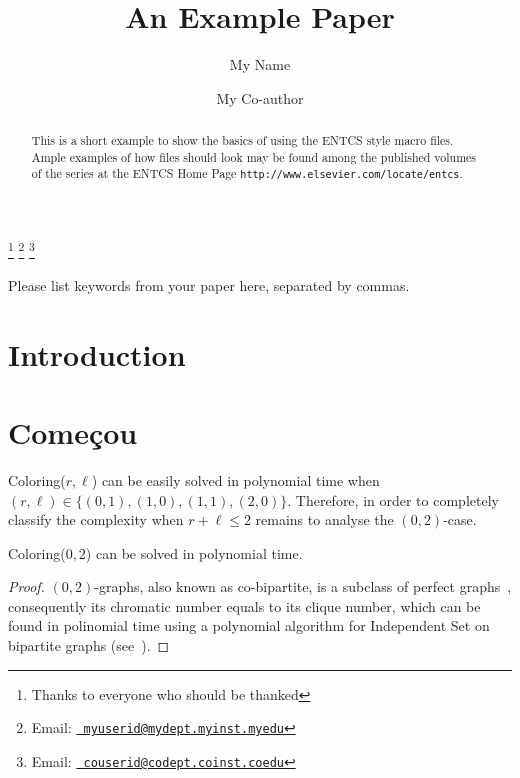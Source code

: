 \documentclass[9pt]{./document-types/entcs} \usepackage{./document-types/entcsmacro}
\begin{document}
\begin{frontmatter}
  \title{An Example Paper} \author{My
    Name}
  \address{My Department\\ My University\\
    My City, My Country} \author{My Co-author}
  \address{My Co-author's Department\\My Co-author's University\\
    My Co-author's City, My Co-author's Country} \thanks[ALL]{Thanks
    to everyone who should be thanked} \thanks[myemail]{Email:
    \href{mailto:myuserid@mydept.myinst.myedu} {\texttt{\normalshape
        myuserid@mydept.myinst.myedu}}} \thanks[coemail]{Email:
    \href{mailto:couserid@codept.coinst.coedu} {\texttt{\normalshape
        couserid@codept.coinst.coedu}}}
\begin{abstract}
  This is a short example to show the basics of using the ENTCS style
  macro files.  Ample examples of how files should look may be found
  among the published volumes of the series at the ENTCS Home Page
  \texttt{http://www.elsevier.com/locate/entcs}.
\end{abstract}
\begin{keyword}
  Please list keywords from your paper here, separated by commas.
\end{keyword}
\end{frontmatter}





\section{Introduction}\label{intro}

\section{Começou}

{\sc Coloring($r,\ell$)} can be easily solved in polynomial time when $(r,\ell) \in \{(0,1),(1,0),(1,1),(2,0)\}$.
Therefore, in order to completely classify the complexity when $r+\ell \leq 2$ remains to analyse the $(0,2)$-case.

	\begin{lemma}
{\sc Coloring($0,2$)} can be solved in polynomial time.
\end{lemma}
	\begin{proof}
$(0,2)$-graphs, also known as co-bipartite, is a subclass of perfect graphs~\cite{bollo98}, consequently its chromatic number
equals to its clique number, which can be found in polinomial time using a polynomial algorithm for {\sc Independent Set}
on bipartite graphs (see~\cite{konig31,zing12}).
	\end{proof}
\end{document}
